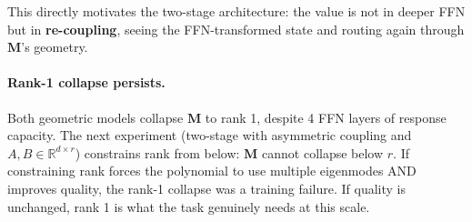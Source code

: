 \documentclass[11pt, a4paper]{article}
\newcommand{\M}{\mathbf{M}}
\newcommand{\R}{\mathbb{R}}
\theoremstyle{plain}
\theoremstyle{definition}
\theoremstyle{remark}
\begin{document}
This directly motivates the two-stage architecture: the value is not in deeper FFN but in \textbf{re-coupling}, seeing the FFN-transformed state and routing again through $\M$'s geometry.

\paragraph{Rank-1 collapse persists.}
Both geometric models collapse $\M$ to rank 1, despite 4 FFN layers of response capacity.
The next experiment (two-stage with asymmetric coupling and $A, B \in \R^{d \times r}$) constrains rank from below: $\M$ cannot collapse below $r$.
If constraining rank forces the polynomial to use multiple eigenmodes AND improves quality, the rank-1 collapse was a training failure.
If quality is unchanged, rank 1 is what the task genuinely needs at this scale.
\end{document}
